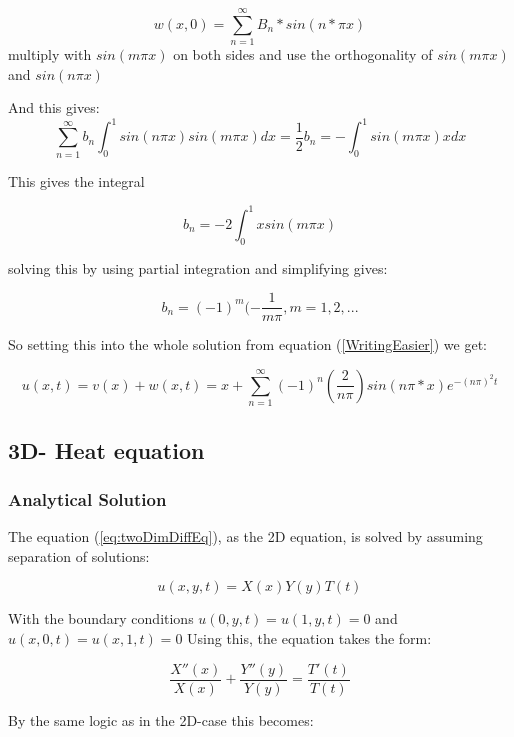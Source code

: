 \documentclass[a4paper,10pt]{article}
\begin{document}
\begin{equation}
 w(x,0) = \sum_{n=1}^{\infty} B_n*sin(n*\pi x)
\end{equation}
multiply with $sin(m\pi x)$ on both sides and use the orthogonality of $sin(m\pi x)$  and $sin(n\pi x)$

And this gives:
\begin{equation}
 \sum_{n=1}^{\infty} b_n \int_0^1 sin(n\pi x)sin(m\pi x)dx = \frac{1}{2}b_n = -\int_0^1 sin(m\pi x)x dx
\end{equation}

This gives the integral

\begin{equation}
 b_n = -2\int_0^1 xsin(m\pi x)
\end{equation}

solving this by using partial integration and simplifying gives:

\begin{equation}
 b_n = (-1)^m(-\frac{1}{m\pi}, m=1,2,...
\end{equation}

So setting this into the whole solution from equation (\ref{WritingEasier}) we get:

\begin{equation}
 u(x,t) = v(x) + w(x,t) = 
 x + \sum_{n=1}^{\infty}(-1)^n(\frac{2}{n\pi})sin(n\pi*x)e^{-(n\pi)^2t}
\end{equation}

\subsection{3D- Heat equation}
\subsubsection{Analytical Solution}
The equation (\ref{eq:twoDimDiffEq}), as the 2D equation, is solved by assuming separation of solutions:

\begin{equation}
 u(x,y,t) = X(x)Y(y)T(t)
\end{equation}

With the boundary conditions $u(0,y,t) = u(1,y,t) = 0$ and $u(x,0,t) = u(x,1,t) = 0$
Using this, the equation takes the form:

\begin{equation}
 \frac{X''(x)}{X(x)} + \frac{Y''(y)}{Y(y)} = \frac{T'(t)}{T(t)} 
\end{equation}

By the same logic as in the 2D-case this becomes:
\end{document}
